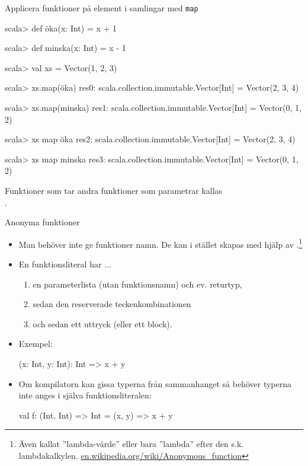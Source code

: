 \begin{Slide}{Applicera funktioner på element i samlingar med \texttt{map}}\SlideFontSmall
\begin{REPL}
scala> def öka(x: Int) = x + 1

scala> def minska(x: Int) = x - 1

scala> val xs = Vector(1, 2, 3)

scala> xs.map(öka)
res0: scala.collection.immutable.Vector[Int] = Vector(2, 3, 4)

scala> xs.map(minska)
res1: scala.collection.immutable.Vector[Int] = Vector(0, 1, 2)

scala> xs map öka
res2: scala.collection.immutable.Vector[Int] = Vector(2, 3, 4)

scala> xs map minska
res3: scala.collection.immutable.Vector[Int] = Vector(0, 1, 2)
\end{REPL}
Funktioner som tar andra funktioner som parametrar kallas \\ .
\end{Slide}




\begin{Slide}{Anonyma funktioner}
\begin{itemize}
\item  Man behöver inte ge funktioner namn. De kan i stället skapas med hjälp av .\footnote{Även kallat ''lambda-värde'' eller bara ''lambda'' efter den s.k. lambdakalkylen. \href{https://en.wikipedia.org/wiki/Anonymous_function}{en.wikipedia.org/wiki/Anonymous\_function}}

\item En funktionsliteral har ...
\begin{enumerate}
\item en parameterlista (utan funktionsnamn) och ev. returtyp, \item sedan den reserverade teckenkombinationen \code{=>} \item och sedan ett uttryck (eller ett block).
\end{enumerate}
\item Exempel:
\begin{Code}[basicstyle=\ttfamily\fontsize{10}{12}\selectfont]
(x: Int, y: Int): Int => x + y
\end{Code}
\pause
\item Om kompilatorn kan gissa typerna från sammanhanget så behöver typerna inte anges i själva  funktionsliteralen:
\begin{Code}[basicstyle=\ttfamily\fontsize{10}{12}\selectfont]
val f: (Int, Int) => Int = (x, y) => x + y
\end{Code}

\end{itemize}
\end{Slide}


